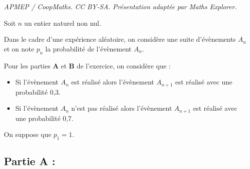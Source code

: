 \documentclass[10pt]{article}
\begin{document}
\noindent\textit{APMEP / CoopMaths. CC BY-SA. Présentation adaptée par Maths Explorer.}\par\medskip
Soit $n$ un entier naturel non nul.

Dans le cadre d'une expérience aléatoire, on considère une suite d'évènements $A_{n}$ et on note $p_{n}$ la probabilité de l'évènement $A_{n}$.

Pour les parties \textbf{A} et \textbf{B} de l'exercice, on considère que :

\begin{itemize}
\item Si l'évènement $A_{n}$ est réalisé alors l'évènement $A_{n+1}$ est réalisé avec une probabilité 0,3.
\item Si l'évènement $A_{n}$ n'est pas réalisé alors l'évènement $A_{n+1}$ est réalisé avec une probabilité 0,7.
\end{itemize}

On suppose que $p_{1}=1$.

\subsection*{Partie A :}
\end{document}
